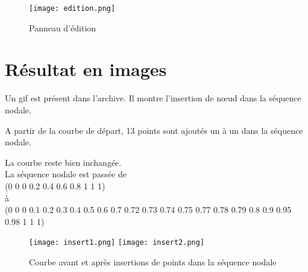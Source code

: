 \documentclass[10pt]{article}
\begin{document}
\begin{figure}[!h]
\centering
\texttt{[image: edition.png]}
\caption{Panneau d'\'edition}
\end{figure}


\section{R\'esultat en images}

Un gif est pr\'esent dans l'archive. Il montre l'insertion de n\oe ud dans la s\'equence nodale.

A partir de la courbe de d\'epart, 13 points sont ajout\'es un \`a un dans la s\'equence nodale.

La courbe reste bien inchang\'ee.\\

La s\'equence nodale est pass\'ee de\\

(0 0 0 0.2 0.4 0.6 0.8 1 1 1)\\

\`a \\

(0 0 0 0.1 0.2 0.3 0.4 0.5 0.6 0.7 0.72 0.73 0.74 0.75 0.77 0.78 0.79 0.8 0.9 0.95 0.98 1 1 1)

\begin{figure}[!h]
\centering
\texttt{[image: insert1.png]}\vspace{.4cm}
\texttt{[image: insert2.png]}
\caption{Courbe avant et apr\`es insertions de points dans la s\'equence nodale}
\end{figure}
\end{document}

